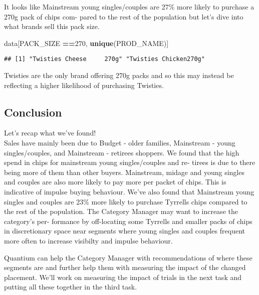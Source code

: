 \documentclass[]{article}
\newenvironment{Shaded}{\begin{snugshade}}{\end{snugshade}}
\newcommand{\DecValTok}[1]{\textcolor[rgb]{0.00,0.00,0.81}{#1}}
\newcommand{\KeywordTok}[1]{\textcolor[rgb]{0.13,0.29,0.53}{\textbf{#1}}}
\newcommand{\NormalTok}[1]{#1}
\newcommand{\OperatorTok}[1]{\textcolor[rgb]{0.81,0.36,0.00}{\textbf{#1}}}
\begin{document}
It looks like Mainstream young singles/couples are 27\% more likely to
purchase a 270g pack of chips com- pared to the rest of the population
but let's dive into what brands sell this pack size.

\begin{Shaded}
\begin{Highlighting}[]
\NormalTok{data[PACK_SIZE }\OperatorTok{==}\DecValTok{270}\NormalTok{, }\KeywordTok{unique}\NormalTok{(PROD_NAME)]}
\end{Highlighting}
\end{Shaded}

\begin{verbatim}
## [1] "Twisties Cheese     270g" "Twisties Chicken270g"
\end{verbatim}

Twisties are the only brand offering 270g packs and so this may instead
be reflecting a higher likelihood of purchasing Twisties.

\hypertarget{conclusion}{%
\subsection{Conclusion}\label{conclusion}}

Let's recap what we've found!\\
Sales have mainly been due to Budget - older families, Mainstream -
young singles/couples, and Mainstream - retirees shoppers. We found that
the high spend in chips for mainstream young singles/couples and re-
tirees is due to there being more of them than other buyers. Mainstream,
midage and young singles and couples are also more likely to pay more
per packet of chips. This is indicative of impulse buying behaviour.
We've also found that Mainstream young singles and couples are 23\% more
likely to purchase Tyrrells chips compared to the rest of the
population. The Category Manager may want to increase the category's
per- formance by off-locating some Tyrrells and smaller packs of chips
in discretionary space near segments where young singles and couples
frequent more often to increase visibilty and impulse behaviour.

Quantium can help the Category Manager with recommendations of where
these segments are and further help them with measuring the impact of
the changed placement. We'll work on measuring the impact of trials in
the next task and putting all these together in the third task.
\end{document}
